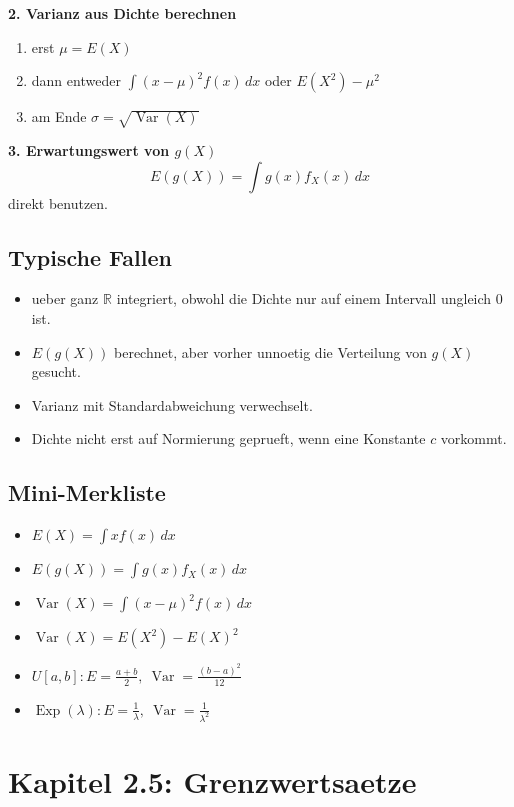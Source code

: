 \documentclass[a4paper,11pt]{article}
\begin{document}
\textbf{2. Varianz aus Dichte berechnen}
\begin{enumerate}
  \item erst $\mu=E(X)$
  \item dann entweder $\int (x-\mu)^2f(x)\,dx$ oder $E(X^2)-\mu^2$
  \item am Ende $\sigma=\sqrt{\operatorname{Var}(X)}$
\end{enumerate}

\textbf{3. Erwartungswert von $g(X)$}
\[
E(g(X))=\int g(x)f_X(x)\,dx
\]
direkt benutzen.

\subsection{Typische Fallen}
\begin{itemize}
  \item ueber ganz $\mathbb R$ integriert, obwohl die Dichte nur auf einem Intervall ungleich $0$ ist.
  \item $E(g(X))$ berechnet, aber vorher unnoetig die Verteilung von $g(X)$ gesucht.
  \item Varianz mit Standardabweichung verwechselt.
  \item Dichte nicht erst auf Normierung geprueft, wenn eine Konstante $c$ vorkommt.
\end{itemize}

\subsection{Mini-Merkliste}
\begin{itemize}
  \item $\displaystyle E(X)=\int x f(x)\,dx$
  \item $\displaystyle E(g(X))=\int g(x)f_X(x)\,dx$
  \item $\displaystyle \operatorname{Var}(X)=\int (x-\mu)^2f(x)\,dx$
  \item $\displaystyle \operatorname{Var}(X)=E(X^2)-E(X)^2$
  \item $\displaystyle U[a,b]: E=\frac{a+b}{2},\ \operatorname{Var}=\frac{(b-a)^2}{12}$
  \item $\displaystyle \operatorname{Exp}(\lambda): E=\frac1\lambda,\ \operatorname{Var}=\frac1{\lambda^2}$
\end{itemize}

\section{Kapitel 2.5: Grenzwertsaetze}
\end{document}
